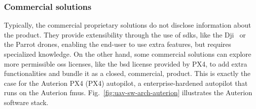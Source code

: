 



\subsubsection{Commercial solutions}%
\label{sec:commercial-solutions-sw}
Typically, the commercial proprietary solutions do not disclose information
about the product. They provide extensibility through the use of
\glspl{sdk}, like the Dji~\cite{djiSDK} or the Parrot drones\cite{parrot-sdk}, enabling the end-user to use
extra features, but requires specialized knowledge.
%
On the other hand, some commercial solutions can explore
more permissible \gls{oss} licenses, like the \gls{bsd} license provided by PX4,
to add extra functionalities and bundle it as a closed, commercial,
product. This is exactly the case for the Auterion PX4 (PX4) autopilot, a
enterprise-hardened autopilot that runs on the Auterion \glspl{fmu}.
Fig.~\ref{fig:uav-sw-arch-auterion} illustrates the Auterion software stack.

